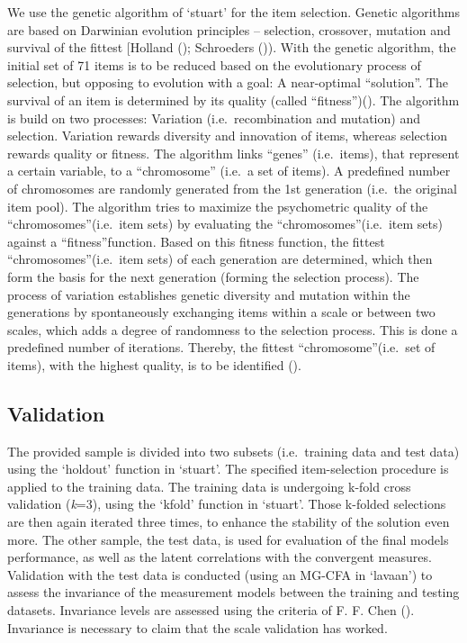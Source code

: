 \documentclass[
  12pt,
  a4paper,
  twoside]{article}
\begin{document}
We use the genetic algorithm of `stuart' for the item selection. Genetic algorithms are based on Darwinian evolution principles -- selection, crossover, mutation and survival of the fittest {[}Holland (); Schroeders ()). With the genetic algorithm, the initial set of 71 items is to be reduced based on the evolutionary process of selection, but opposing to evolution with a goal: A near-optimal ``solution''. The survival of an item is determined by its quality (called ``fitness'')(). The algorithm is build on two processes: Variation (i.e.~recombination and mutation) and selection. Variation rewards diversity and innovation of items, whereas selection rewards quality or fitness. The algorithm links ``genes'' (i.e.~items), that represent a certain variable, to a ``chromosome'' (i.e.~a set of items). A predefined number of chromosomes are randomly generated from the 1st generation (i.e.~the original item pool). The algorithm tries to maximize the psychometric quality of the ``chromosomes''(i.e.~item sets) by evaluating the ``chromosomes''(i.e.~item sets) against a ``fitness''function. Based on this fitness function, the fittest ``chromosomes''(i.e.~item sets) of each generation are determined, which then form the basis for the next generation (forming the selection process). The process of variation establishes genetic diversity and mutation within the generations by spontaneously exchanging items within a scale or between two scales, which adds a degree of randomness to the selection process. This is done a predefined number of iterations. Thereby, the fittest ``chromosome''(i.e.~set of items), with the highest quality, is to be identified ().

\subsection{Validation}\label{validation}

The provided sample is divided into two subsets (i.e.~training data and test data) using the `holdout' function in `stuart'. The specified item-selection procedure is applied to the training data. The training data is undergoing k-fold cross validation (\emph{k}=3), using the `kfold' function in `stuart'. Those k-folded selections are then again iterated three times, to enhance the stability of the solution even more. The other sample, the test data, is used for evaluation of the final models performance, as well as the latent correlations with the convergent measures.
Validation with the test data is conducted (using an MG-CFA in `lavaan') to assess the invariance of the measurement models between the training and testing datasets. Invariance levels are assessed using the criteria of F. F. Chen (). Invariance is necessary to claim that the scale validation has worked.
\end{document}
